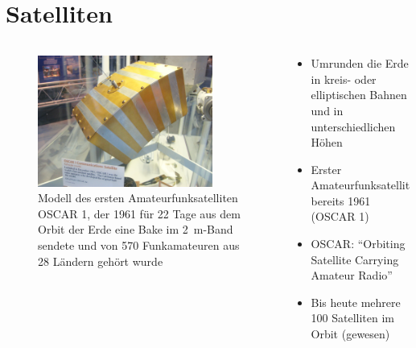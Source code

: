 
\section{Satelliten}
\label{section:satelliten}
\begin{frame}%

\begin{columns}
    \begin{column}{0.48\textwidth}
    
\begin{figure}
    \includegraphics[width=0.85\textwidth]{foto/124}
    \caption{\scriptsize Modell des ersten Amateurfunksatelliten OSCAR 1, der 1961 für 22 Tage aus dem Orbit der Erde eine Bake im \qty{2}{\metre}-Band sendete und von 570 Funkamateuren aus 28 Ländern gehört wurde}
    \label{n_satellit_oscar1}
\end{figure}

    \end{column}
   \begin{column}{0.48\textwidth}
       \begin{itemize}
  \item Umrunden die Erde in kreis- oder elliptischen Bahnen und in unterschiedlichen Höhen
  \item Erster Amateurfunksatellit bereits 1961 (OSCAR 1)
  \item OSCAR: \enquote{Orbiting Satellite Carrying Amateur Radio}
  \item Bis heute mehrere 100 Satelliten im Orbit (gewesen)
  \end{itemize}

   \end{column}
\end{columns}

\end{frame}

